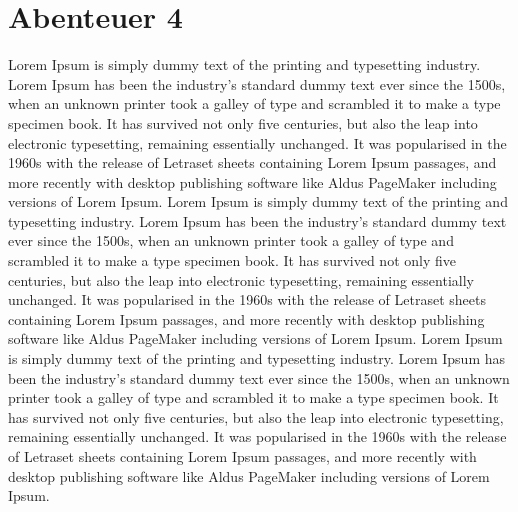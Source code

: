 \documentclass[11pt]{article}
\begin{document}
\section{Abenteuer 4}
\label{sec:org2489090}
Lorem Ipsum is simply dummy text of the printing and typesetting
industry. Lorem Ipsum has been the industry's standard dummy text ever
since the 1500s, when an unknown printer took a galley of type and
scrambled it to make a type specimen book. It has survived not only
five centuries, but also the leap into electronic typesetting,
remaining essentially unchanged. It was popularised in the 1960s with
the release of Letraset sheets containing Lorem Ipsum passages, and
more recently with desktop publishing software like Aldus PageMaker
including versions of Lorem Ipsum. 
Lorem Ipsum is simply dummy text of the printing and typesetting
industry. Lorem Ipsum has been the industry's standard dummy text ever
since the 1500s, when an unknown printer took a galley of type and
scrambled it to make a type specimen book. It has survived not only
five centuries, but also the leap into electronic typesetting,
remaining essentially unchanged. It was popularised in the 1960s with
the release of Letraset sheets containing Lorem Ipsum passages, and
more recently with desktop publishing software like Aldus PageMaker
including versions of Lorem Ipsum. Lorem Ipsum is simply dummy text of
the printing and typesetting industry. Lorem Ipsum has been the
industry's standard dummy text ever since the 1500s, when an unknown
printer took a galley of type and scrambled it to make a type specimen
book. It has survived not only five centuries, but also the leap into
electronic typesetting, remaining essentially unchanged. It was
popularised in the 1960s with the release of Letraset sheets
containing Lorem Ipsum passages, and more recently with desktop
publishing software like Aldus PageMaker including versions of Lorem
Ipsum. 
\end{document}
